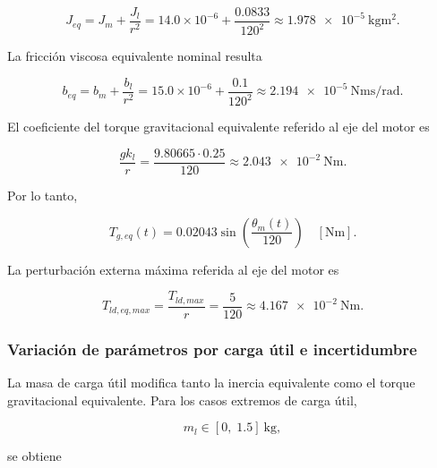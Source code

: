 \documentclass[10pt,a4paper]{article}
\begin{document}
\begin{equation}
    J_{eq}
    =
    J_m+
    \frac{J_l}{r^2}
    =
    14.0\times10^{-6}
    +
    \frac{0.0833}{120^2}
    \approx
    \SI{1.978e-5}{\kilogram\meter\squared}.
    \label{eq:jeq_nominal}
\end{equation}

La fricción viscosa equivalente nominal resulta

\begin{equation}
    b_{eq}
    =
    b_m+
    \frac{b_l}{r^2}
    =
    15.0\times10^{-6}
    +
    \frac{0.1}{120^2}
    \approx
    \SI{2.194e-5}{\newton\meter\second\per\radian}.
    \label{eq:beq_nominal}
\end{equation}

El coeficiente del torque gravitacional equivalente referido al eje del motor es

\begin{equation}
    \frac{g k_l}{r}
    =
    \frac{9.80665 \cdot 0.25}{120}
    \approx
    \SI{2.043e-2}{\newton\meter}.
    \label{eq:torque_grav_eq_nominal}
\end{equation}

Por lo tanto,

\begin{equation}
    T_{g,eq}(t)
    =
    0.02043
    \sin\left(
    \frac{\theta_m(t)}{120}
    \right)
    \quad [\si{\newton\meter}].
    \label{eq:tg_eq_nominal}
\end{equation}

La perturbación externa máxima referida al eje del motor es

\begin{equation}
    T_{ld,eq,max}
    =
    \frac{T_{ld,max}}{r}
    =
    \frac{5}{120}
    \approx
    \SI{4.167e-2}{\newton\meter}.
    \label{eq:tld_eq_max}
\end{equation}

\subsubsection{Variación de parámetros por carga útil e incertidumbre}

La masa de carga útil modifica tanto la inercia equivalente como el torque gravitacional equivalente. Para los casos extremos de carga útil,

\begin{equation}
    m_l \in [0,\;1.5]\ \si{\kilogram},
\end{equation}

se obtiene
\end{document}
